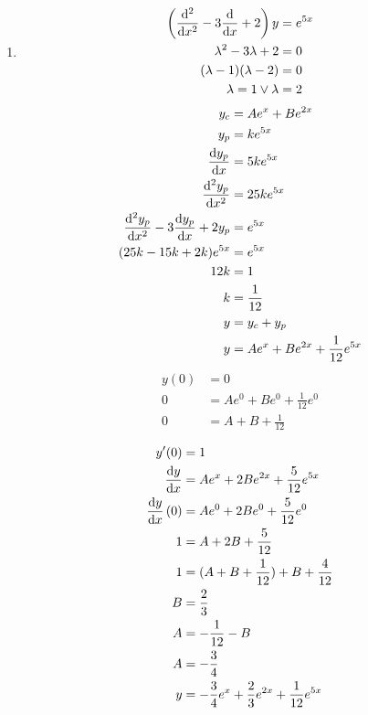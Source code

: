 \documentclass[10pt,\jkfside,a4paper]{article}
\begin{document}
\begin{enumerate}
\begin{enumerate}
\item
\begin{equation}
\begin{split}
\left(\dv[2]{x} - 3\dv{x} + 2\right)y &= e^{5x}\\
\lambda^2 - 3\lambda + 2 &= 0\\
(\lambda - 1)(\lambda - 2) &= 0\\
\lambda = 1 \vee \lambda &= 2\\
\end{split}
\end{equation}
\begin{equation}
\begin{split}
y_c &= Ae^x + Be^{2x}\\
y_p &= ke^{5x}\\
\dv{y_p}{x} &= 5ke^{5x}\\
\dv[2]{y_p}{x} &= 25ke^{5x}\\
\dv[2]{y_p}{x} - 3\dv{y_p}{x} + 2y_p &= e^{5x}\\
(25k - 15k + 2k)e^{5x} &= e^{5x}\\
12k &= 1\\
k &= \frac{1}{12}\\
y &= y_c + y_p \\
y &= Ae^x + Be^{2x} + \frac{1}{12}e^{5x}\\
\end{split}
\end{equation}
\begin{equation}
\begin{split}
y(0) &= 0\\
0 &= Ae^0 + Be^{0} + \frac{1}{12}e^{0}\\
0 &= A + B + \frac{1}{12}\\
\end{split}
\end{equation}
\begin{equation}
\begin{split}
y'(0) &= 1\\
\dv{y}{x} &= Ae^x + 2Be^{2x} + \frac{5}{12}e^{5x}\\
\dv{y}{x}\left(0\right) &= Ae^0 + 2Be^0 + \frac{5}{12}e^0\\
1 &= A + 2B + \frac{5}{12}\\
1 &= (A + B + \frac{1}{12}) + B + \frac{4}{12}\\
B &= \frac{2}{3}\\
A &= -\frac{1}{12} - B\\
A &= -\frac{3}{4}\\
y &= -\frac{3}{4}e^x + \frac{2}{3}e^{2x} + \frac{1}{12}e^{5x}\\
\end{split}
\end{equation}


\end{enumerate}
\end{enumerate}
\end{document}
